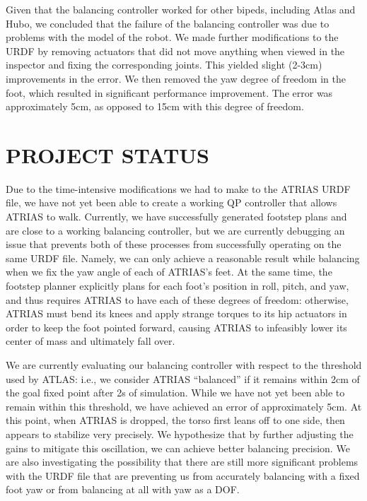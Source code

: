 \documentclass[letterpaper, 10 pt, conference]{ieeeconf}  %
\begin{document}
Given that the balancing controller worked for other bipeds, including Atlas and Hubo, we concluded that the failure of the balancing controller was due to problems with the model of the robot. We made further modifications to the URDF by removing actuators that did not move anything when viewed in the inspector and fixing the corresponding joints. This yielded slight (2-3cm) improvements in the error. We then removed the yaw degree of freedom in the foot, which resulted in significant performance improvement. The error was approximately 5cm, as opposed to 15cm with this degree of freedom.

\section{PROJECT STATUS}

Due to the time-intensive modifications we had to make to the ATRIAS URDF file, we have not yet been able to create a working QP controller that allows ATRIAS to walk. Currently, we have successfully generated footstep plans and are close to a working balancing controller, but we are currently debugging an issue that prevents both of these processes from successfully operating on the same URDF file. Namely, we can only achieve a reasonable result while balancing when we fix the yaw angle of each of ATRIAS’s feet. At the same time, the footstep planner explicitly plans for each foot’s position in roll, pitch, and yaw, and thus requires ATRIAS to have each of these degrees of freedom: otherwise, ATRIAS must bend its knees and apply strange torques to its hip actuators in order to keep the foot pointed forward, causing ATRIAS to infeasibly lower its center of mass and ultimately fall over.

We are currently evaluating our balancing controller with respect to the threshold used by ATLAS: i.e., we consider ATRIAS “balanced” if it remains within 2cm of the goal fixed point after 2s of simulation. While we have not yet been able to remain within this threshold, we have achieved an error of approximately 5cm. At this point, when ATRIAS is dropped, the torso first leans off to one side, then appears to stabilize very precisely. We hypothesize that by further adjusting the gains to mitigate this oscillation, we can achieve better balancing precision. We are also investigating the possibility that there are still more significant problems with the URDF file that are preventing us from accurately balancing with a fixed foot yaw or from balancing at all with yaw as a DOF.
\end{document}
